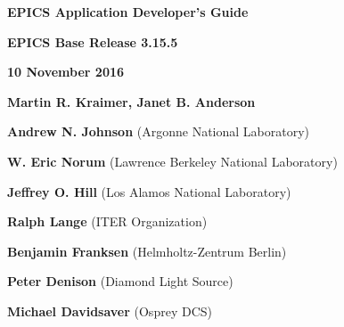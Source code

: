 \def\divider{\par
  \vskip 0.5in
  \hrulefill
  \vskip 0.5in
}

\divider

\noindent \Huge \textbf{EPICS Application Developer's Guide}

\vskip 0.5in

\noindent \Large \textbf{EPICS Base Release 3.15.5}

\noindent \textbf{10 November 2016}

\vskip 0.5in

\normalsize
\noindent \textbf{Martin R. Kraimer, Janet B. Anderson}

\noindent \textbf{Andrew N. Johnson} (Argonne National Laboratory)

\noindent \textbf{W. Eric Norum} (Lawrence Berkeley National Laboratory)

\noindent \textbf{Jeffrey O. Hill} (Los Alamos National Laboratory)

\noindent \textbf{Ralph Lange} (ITER Organization)

\noindent \textbf{Benjamin Franksen} (Helmholtz-Zentrum Berlin)

\noindent \textbf{Peter Denison} (Diamond Light Source)

\noindent \textbf{Michael Davidsaver} (Osprey DCS)

\divider
